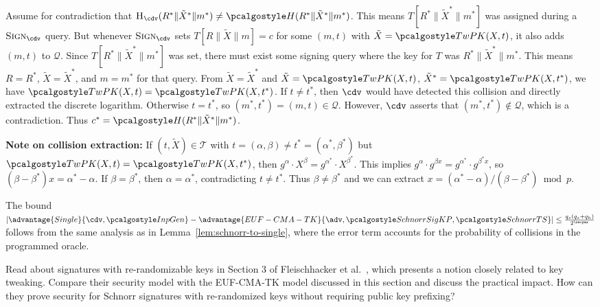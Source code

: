 \begin{mysolution}
  Assume for contradiction that $\pcoracle{H}_{\cdv}(R^* \| \tilde{X}^* \| m^*) \neq \algo{H}(R^* \| \tilde{X}^* \| m^*)$.
  This means $T[R^* \| \tilde{X}^* \| m^*]$ was assigned during a $\pcoracle{Sign}_{\cdv}$ query.
  But whenever $\pcoracle{Sign}_{\cdv}$ sets $T[R \| \tilde{X} \| m] = c$ for some $(m, t)$ with $\tilde{X} = \algo{TwPK}(X, t)$, it also adds $(m, t)$ to $\mathcal{Q}$.
  Since $T[R^* \| \tilde{X}^* \| m^*]$ was set, there must exist some signing query where the key for $T$ was $R^* \| \tilde{X}^* \| m^*$.
  This means $R = R^*$, $\tilde{X} = \tilde{X}^*$, and $m = m^*$ for that query.
  From $\tilde{X} = \tilde{X}^*$ and $\tilde{X} = \algo{TwPK}(X, t)$, $\tilde{X}^* = \algo{TwPK}(X, t^*)$, we have $\algo{TwPK}(X, t) = \algo{TwPK}(X, t^*)$.
  If $t \neq t^*$, then $\cdv$ would have detected this collision and directly extracted the discrete logarithm.
  Otherwise $t = t^*$, so $(m^*, t^*) = (m, t) \in \mathcal{Q}$.
  However, $\cdv$ asserts that $(m^*, t^*) \notin \mathcal{Q}$, which is a contradiction.
  Thus $c^* = \algo{H}(R^* \| \tilde{X}^* \| m^*)$.
  
  \textbf{Note on collision extraction:} If $(t, \tilde{X}) \in \mathcal{T}$ with $t = (\alpha, \beta) \neq t^* = (\alpha^*, \beta^*)$ but $\algo{TwPK}(X, t) = \algo{TwPK}(X, t^*)$, then $g^\alpha \cdot X^\beta = g^{\alpha^*} \cdot X^{\beta^*}$.
  This implies $g^\alpha \cdot g^{\beta x} = g^{\alpha^*} \cdot g^{\beta^* x}$, so $(\beta - \beta^*)x = \alpha^* - \alpha$.
  If $\beta = \beta^*$, then $\alpha = \alpha^*$, contradicting $t \neq t^*$.
  Thus $\beta \neq \beta^*$ and we can extract $x = (\alpha^* - \alpha)/(\beta - \beta^*) \bmod p$.
  
  The bound $|\advantage{Single}{\cdv, \algo{InpGen}} - \advantage{EUF-CMA-TK}{\adv, \algo{SchnorrSigKP}, \algo{SchnorrTS}}| \leq \frac{q_s(q_s + q_h)}{2^\secpar}$ follows from the same analysis as in Lemma~\ref{lem:schnorr-to-single}, where the error term accounts for the probability of collisions in the programmed oracle.
\end{mysolution}
\fi

\begin{exercise}[Optional]
  Read about signatures with re-randomizable keys in Section 3 of Fleischhacker et al.~\cite{PKC:FKMSSS16}, which presents a notion closely related to key tweaking.
  Compare their security model with the EUF-CMA-TK model discussed in this section and discuss the practical impact.
  How can they prove security for Schnorr signatures with re-randomized keys without requiring public key prefixing?
\end{exercise}
